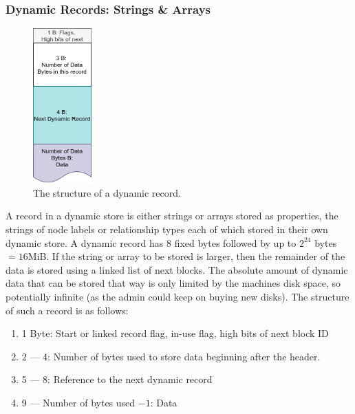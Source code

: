\documentclass[a4paper,10pt]{article}
\begin{document}
        \subsubsection{Dynamic Records: Strings \& Arrays}\label{dynamic}
            \begin{figure}[htp]\label{dynamic_rec}
                \begin{center}
                    \includegraphics[keepaspectratio,height=0.2\textheight,width=0.2\textwidth]{img/03_record/dynamic.png}
                \end{center}
                \caption{The structure of a dynamic record.} %
            \end{figure}
            A record in a dynamic store is either strings or arrays stored as properties,  the strings of node labels or relationship types each of which stored in their own dynamic store.
            A dynamic record has 8 fixed bytes followed by up to $2^{24}$ bytes $= 16 $MiB.
            If the string or array to be stored is larger, then the remainder of the data is stored using a linked list of next blocks.
            The absolute amount of dynamic data that can be stored that way is only limited by the machines disk space, so potentially infinite (as the admin could keep on buying new disks). 
            The structure of such a record is as follows:
            \begin{enumerate}
                \item 1 Byte: Start or linked record flag, in-use flag, high bits of next block ID
                \item 2 --- 4: Number of bytes used to store data beginning after the header.
                \item 5 --- 8: Reference to the next dynamic record
                \item 9 --- Number of bytes used $- 1$: Data
            \end{enumerate}
            
\end{document}
